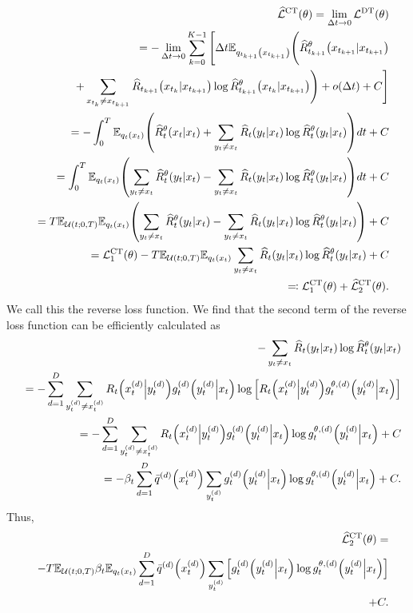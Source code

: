 \documentclass{article}
\begin{document}
\begin{eqnarray*}
  &&\widehat{\mathcal{L}}^\text{CT}(\theta) = \lim_{\Delta t\to 0}\mathcal{L}^\text{DT}(\theta) \\
  &&= - \lim_{\Delta t\to 0}\sum_{k=0}^{K-1}\Bigg[\Delta t\mathbb{E}_{q_{t_{k+1}}\qty(x_{t_{k+1}})}\Bigg(\widehat{R}_{t_{k+1}}^\theta\qty(x_{t_{k+1}}|x_{t_{k+1}}) \\
  &&+ \sum_{x_{t_k}\neq x_{t_{k+1}}}\widehat{R}_{t_{k+1}}\qty(x_{t_k}|x_{t_{k+1}}) \log \widehat{R}_{t_{k+1}}^\theta\qty(x_{t_k}|x_{t_{k+1}})\Bigg) + o(\Delta t) + C\Bigg] \\
  &&= - \int_0^T \mathbb{E}_{q_t\qty(x_t)}\qty(\widehat{R}_t^\theta\qty(x_t|x_t) + \sum_{y_t\neq x_t}\widehat{R}_t\qty(y_t|x_t)\log\widehat{R}_t^\theta\qty(y_t|x_t))dt + C\\
  &&=\int_0^T \mathbb{E}_{q_t\qty(x_t)}\qty(\sum_{y_t\neq x_t}\widehat{R}_t^\theta\qty(y_t|x_t) - \sum_{y_t\neq x_t}\widehat{R}_t\qty(y_t|x_t)\log\widehat{R}_t^\theta\qty(y_t|x_t))dt + C\\
  &&=T\mathbb{E}_{\mathcal{U}(t;0,T)}\mathbb{E}_{q_t\qty(x_t)}\qty(\sum_{y_t\neq x_t}\widehat{R}_t^\theta\qty(y_t|x_t) - \sum_{y_t\neq x_t}\widehat{R}_t\qty(y_t|x_t)\log\widehat{R}_t^\theta\qty(y_t|x_t)) + C\\
  &&=\mathcal{L}_1^\text{CT}(\theta) - T\mathbb{E}_{\mathcal{U}(t;0,T)}\mathbb{E}_{q_t\qty(x_t)}\sum_{y_t\neq x_t}\widehat{R}_t\qty(y_t|x_t)\log\widehat{R}_t^\theta\qty(y_t|x_t) + C\\
  &&\eqqcolon \mathcal{L}_1^\text{CT}(\theta) + \widehat{\mathcal{L}}_2^\text{CT}(\theta).
\end{eqnarray*}
We call this the reverse loss function. We find that the second term of the reverse loss function can be efficiently calculated as
\begin{eqnarray*}
  && - \sum_{y_t\neq x_t}\widehat{R}_t\qty(y_t\middle|x_t)\log\widehat{R}_t^\theta\qty(y_t\middle|x_t) \\
  && = - \sum_{d=1}^D\sum_{y^{(d)}_t\neq x^{(d)}_t}R_t\qty(x^{(d)}_t\middle|y^{(d)}_t)g_t^{(d)}\qty(y^{(d)}_t\middle|x_t)\log\qty[R_t\qty(x^{(d)}_t\middle|y^{(d)}_t)g_t^{\theta, (d)}\qty(y^{(d)}_t\middle|x_t)] \\
  && = - \sum_{d=1}^D\sum_{y^{(d)}_t\neq x^{(d)}_t}R_t\qty(x^{(d)}_t\middle|y^{(d)}_t)g_t^{(d)}\qty(y^{(d)}_t\middle|x_t)\log g_t^{\theta, (d)}\qty(y^{(d)}_t\middle|x_t) + C \\
  && = - \beta_t\sum_{d=1}^D \bar{q}^{(d)}\qty(x^{(d)}_t)\sum_{y^{(d)}_t}g_t^{(d)}\qty(y^{(d)}_t\middle|x_t)\log g_t^{\theta, (d)}\qty(y^{(d)}_t\middle|x_t) + C.
\end{eqnarray*}
Thus,
\begin{eqnarray}\label{eq:ELBOreverse}
  &&\widehat{\mathcal{L}}_2^\text{CT}(\theta) =\nonumber\\
  &&-T\mathbb{E}_{\mathcal{U}(t;0,T)}\beta_t\mathbb{E}_{q_t\qty(x_t)}\sum_{d=1}^D\bar{q}^{(d)}\qty(x^{(d)}_t)\sum_{y^{(d)}_t}\qty[g_t^{(d)}\qty(y^{(d)}_t\middle|x_t)\log g_t^{\theta, (d)}\qty(y^{(d)}_t\middle|x_t)] \nonumber\\
  &&+ C.
\end{eqnarray}
\end{document}
